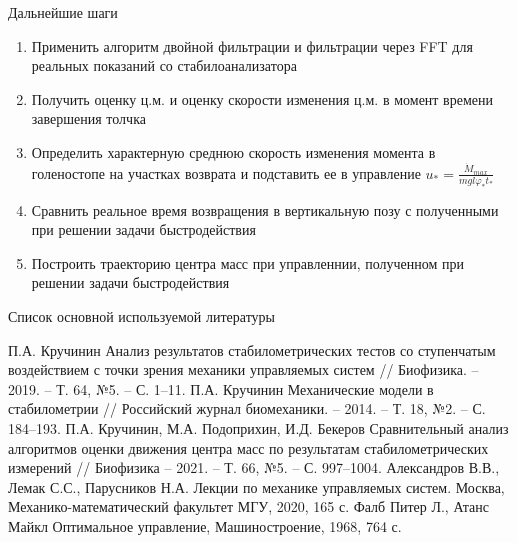 \documentclass[10pt]{beamer}
\begin{document}
\begin{frame}{Дальнейшие шаги}
	\begin{enumerate}
		\item Применить алгоритм двойной фильтрации и фильтрации через FFT для реальных показаний со стабилоанализатора
		\item Получить оценку ц.м. и оценку скорости изменения ц.м. в момент времени завершения толчка
		\item Определить характерную среднюю скорость изменения момента в голеностопе на участках возврата и подставить ее в управление $u_{\ast}=\frac{\dot{M}_{max}}{mgl\varphi_\ast t_\ast}$
		\item Сравнить реальное время возвращения в вертикальную позу с полученными при решении задачи быстродействия
		\item Построить траекторию центра масс при управленнии, полученном при решении задачи быстродействия
	  \end{enumerate}
	
\end{frame}
\begin{frame}{Список основной используемой литературы}

\begin{thebibliography}{15}
	П.А. Кручинин Анализ результатов стабилометрических тестов со ступенчатым воздействием с точки зрения механики управляемых систем
    // Биофизика. – 2019. – Т. 64, №5. – С. 1–11.
	П.А. Кручинин Механические модели в стабилометрии // Российский журнал биомеханики. – 2014. – Т. 18, №2. – С. 184–193.
	П.А. Кручинин, М.А. Подоприхин, И.Д. Бекеров Сравнительный анализ алгоритмов оценки движения центра масс по результатам стабилометрических измерений // Биофизика – 2021. – Т. 66, №5. – С. 997–1004. 
	 Александров В.В., Лемак С.С., Парусников Н.А. Лекции по механике управляемых систем. Москва, Механико-математический факультет МГУ, 2020, 165 с.
	Фалб Питер Л., Атанс Майкл Оптимальное управление, Машиностроение, 1968, 764 с.
\end{thebibliography}
\end{frame}
\end{document}

